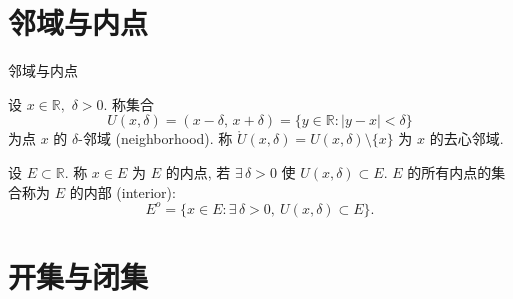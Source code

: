 
\section[邻域内点]{邻域与内点}


\begin{frame}{邻域与内点}

\begin{Def}[邻域]
设 $x \in \mathbb{R},$ $\delta > 0.$ 称集合
\[
U(x, \delta) = (x - \delta,\, x + \delta) = \{ y \in \mathbb{R} : |y - x| < \delta \}
\]
为点 $x$ 的 \alert{$\delta$-邻域} (neighborhood). 称 $\mathring{U}(x, \delta) = U(x, \delta) \setminus \{x\}$ 为 $x$ 的\alert{去心邻域}.
\end{Def}

\pause
\vspace{1em}

\begin{Def}[内点与内部]
设 $E \subset \mathbb{R}.$ 称 $x \in E$ 为 $E$ 的\alert{内点}, 若 $\exists\, \delta > 0$ 使 $U(x, \delta) \subset E.$ $E$ 的所有内点的集合称为 $E$ 的\alert{内部} (interior):
\[
E^o = \{ x \in E : \exists\, \delta > 0,\ U(x, \delta) \subset E \}.
\]
\end{Def}

\end{frame}


\section[开闭集]{开集与闭集}


